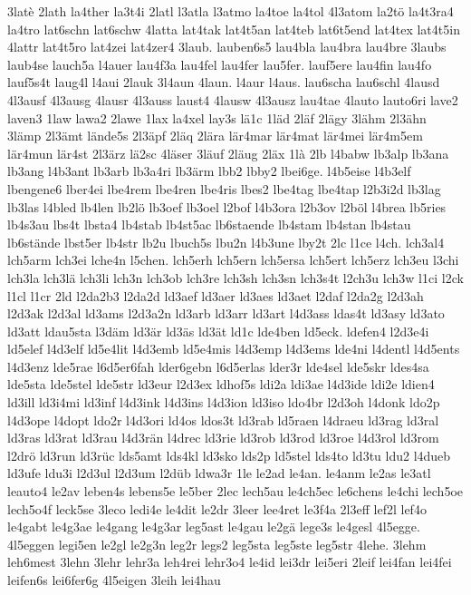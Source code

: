 {3latè
2lath
la4ther
la3t4i
2latl
l3atla
l3atmo
la4toe
la4tol
4l3atom
la2tö
la4t3ra4
la4tro
lat6schn
lat6schw
4latta
lat4tak
lat4t5an
lat4teb
lat6t5end
lat4tex
lat4t5in
4lattr
lat4t5ro
lat4zei
lat4zer4
3laub.
lauben6s5
lau4bla
lau4bra
lau4bre
3laubs
laub4se
lauch5a
l4auer
lau4f3a
lau4fel
lau4fer
lau5fer.
lauf5ere
lau4fin
lau4fo
lauf5s4t
laug4l
l4aui
2lauk
3l4aun
4laun.
l4aur
l4aus.
lau6scha
lau6schl
4lausd
4l3ausf
4l3ausg
4lausr
4l3auss
laust4
4lausw
4l3ausz
lau4tae
4lauto
lauto6ri
lave2
laven3
1law
lawa2
2lawe
1lax
la4xel
lay3s
lä1c
1läd
2läf
2lägy
3lähm
2l3ähn
3lämp
2l3ämt
lände5s
2l3äpf
2läq
2lära
lär4mar
lär4mat
lär4mei
lär4m5em
lär4mun
lär4st
2l3ärz
lä2sc
4läser
3läuf
2läug
2läx
1là
2lb
l4babw
lb3alp
lb3ana
lb3ang
l4b3ant
lb3arb
lb3a4ri
lb3ärm
lbb2
lbby2
lbei6ge.
l4b5eise
l4b3elf
lbengene6
lber4ei
lbe4rem
lbe4ren
lbe4ris
lbes2
lbe4tag
lbe4tap
l2b3i2d
lb3lag
lb3las
l4bled
lb4len
lb2lö
lb3oef
lb3oel
l2bof
l4b3ora
l2b3ov
l2böl
l4brea
lb5ries
lb4s3au
lbs4t
lbsta4
lb4stab
lb4st5ac
lb6staende
lb4stam
lb4stan
lb4stau
lb6stände
lbst5er
lb4str
lb2u
lbuch5s
lbu2n
l4b3une
lby2t
2lc
l1ce
l4ch.
lch3al4
lch5arm
lch3ei
lche4n
l5chen.
lch5erh
lch5ern
lch5ersa
lch5ert
lch5erz
lch3eu
l3chi
lch3la
lch3lä
lch3li
lch3n
lch3ob
lch3re
lch3sh
lch3sn
lch3s4t
l2ch3u
lch3w
l1ci
l2ck
l1cl
l1cr
2ld
l2da2b3
l2da2d
ld3aef
ld3aer
ld3aes
ld3aet
l2daf
l2da2g
l2d3ah
l2d3ak
l2d3al
ld3ams
l2d3a2n
ld3arb
ld3arr
ld3art
l4d3ass
ldas4t
ld3asy
ld3ato
ld3att
ldau5sta
l3däm
ld3är
ld3äs
ld3ät
ld1c
lde4ben
ld5eck.
ldefen4
l2d3e4i
ld5elef
l4d3elf
ld5e4lit
l4d3emb
ld5e4mis
l4d3emp
l4d3ems
lde4ni
l4dentl
l4d5ents
l4d3enz
lde5rae
l6d5er6fah
lder6gebn
l6d5erlas
lder3r
lde4sel
lde5skr
ldes4sa
lde5sta
lde5stel
lde5str
ld3eur
l2d3ex
ldhof5s
ldi2a
ldi3ae
l4d3ide
ldi2e
ldien4
ld3ill
ld3i4mi
ld3inf
l4d3ink
l4d3ins
l4d3ion
ld3iso
ldo4br
l2d3oh
l4donk
ldo2p
l4d3ope
l4dopt
ldo2r
l4d3ori
ld4os
ldos3t
ld3rab
ld5raen
l4draeu
ld3rag
ld3ral
ld3ras
ld3rat
ld3rau
l4d3rän
l4drec
ld3rie
ld3rob
ld3rod
ld3roe
l4d3rol
ld3rom
l2drö
ld3run
ld3rüc
lds5amt
lds4kl
ld3sko
lds2p
ld5stel
lds4to
ld3tu
ldu2
l4dueb
ld3ufe
ldu3i
l2d3ul
l2d3um
l2düb
ldwa3r
1le
le2ad
le4an.
le4anm
le2as
le3atl
leauto4
le2av
leben4s
lebens5e
le5ber
2lec
lech5au
le4ch5ec
le6chens
le4chi
lech5oe
lech5o4f
leck5se
3leco
ledi4e
le4dit
le2dr
3leer
lee4ret
le3f4a
2l3eff
lef2l
lef4o
le4gabt
le4g3ae
le4gang
le4g3ar
leg5ast
le4gau
le2gä
lege3s
le4gesl
4l5egge.
4l5eggen
legi5en
le2gl
le2g3n
leg2r
legs2
leg5sta
leg5ste
leg5str
4lehe.
3lehm
leh6mest
3lehn
3lehr
lehr3a
leh4rei
lehr3o4
le4id
lei3dr
lei5eri
2leif
lei4fan
lei4fei
leifen6s
lei6fer6g
4l5eigen
3leih
lei4hau
}
